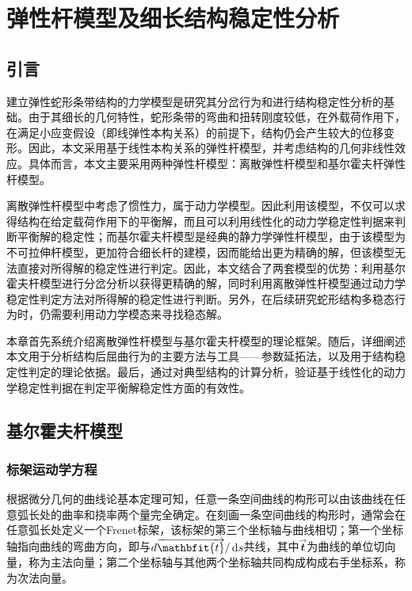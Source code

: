 
\chapter{弹性杆模型及细长结构稳定性分析}

\section{引言}

建立弹性蛇形条带结构的力学模型是研究其分岔行为和进行结构稳定性分析的基础。由于其细长的几何特性，蛇形条带的弯曲和扭转刚度较低，在外载荷作用下，在满足小应变假设（即线弹性本构关系）的前提下，结构仍会产生较大的位移变形。因此，本文采用基于线性本构关系的弹性杆模型，并考虑结构的几何非线性效应。具体而言，本文主要采用两种弹性杆模型：离散弹性杆模型和基尔霍夫杆弹性杆模型。

离散弹性杆模型中考虑了惯性力，属于动力学模型。因此利用该模型，不仅可以求得结构在给定载荷作用下的平衡解，而且可以利用线性化的动力学稳定性判据来判断平衡解的稳定性；而基尔霍夫杆模型是经典的静力学弹性杆模型，由于该模型为不可拉伸杆模型，更加符合细长杆的建模，因而能给出更为精确的解，但该模型无法直接对所得解的稳定性进行判定。因此，本文结合了两套模型的优势：利用基尔霍夫杆模型进行分岔分析以获得更精确的解，同时利用离散弹性杆模型通过动力学稳定性判定方法对所得解的稳定性进行判断。另外，在后续研究蛇形结构多稳态行为时，仍需要利用动力学模态来寻找稳态解。

本章首先系统介绍离散弹性杆模型与基尔霍夫杆模型的理论框架。随后，详细阐述本文用于分析结构后屈曲行为的主要方法与工具——参数延拓法，以及用于结构稳定性判定的理论依据。最后，通过对典型结构的计算分析，验证基于线性化的动力学稳定性判据在判定平衡解稳定性方面的有效性。

\section{基尔霍夫杆模型}
\subsection{标架运动学方程}
根据微分几何的曲线论基本定理可知，任意一条空间曲线的构形可以由该曲线在任意弧长处的曲率和挠率两个量完全确定。在刻画一条空间曲线的构形时，通常会在任意弧长处定义一个Frenet标架，该标架的第三个坐标轴与曲线相切；第一个坐标轴指向曲线的弯曲方向，即与$d\overrightarrow{\mathbfit{t}}/\dif s$共线，其中$\overrightarrow{\mathbfit{t}}$为曲线的单位切向量，称为主法向量；第二个坐标轴与其他两个坐标轴共同构成构成右手坐标系，称为次法向量。

